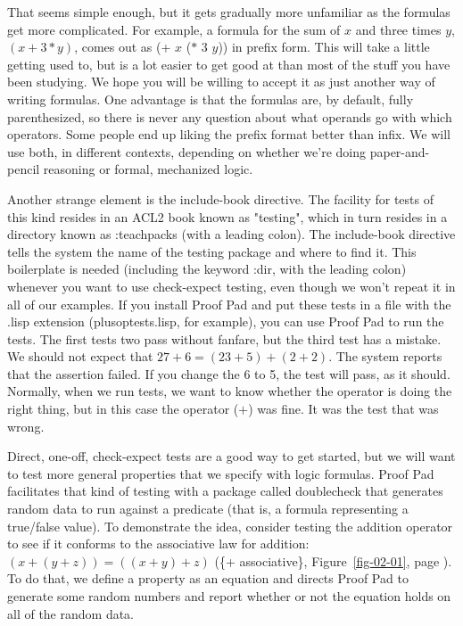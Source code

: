 That seems simple enough, but it gets gradually more unfamiliar
as the formulas get more complicated.
For example, a formula for the sum of $x$ and three times $y$, $(x + 3*y)$,
comes out as (+ $x$ ($*$ $3$ $y$)) in prefix form.
This will take a little getting used to,
but is a lot easier to get good at than
most of the stuff you have been studying.
We hope you will be willing to accept it as just another way of writing formulas.
One advantage is that the formulas are, by default, fully parenthesized,
so there is never any question about what operands go with which operators.
Some people end up liking the prefix format better than infix.
We will use both, in different contexts, depending on whether
we're doing paper-and-pencil reasoning or formal, mechanized logic.

Another strange element is the
include-book directive.
The facility for tests of this kind resides in an ACL2 book
known as "testing", which in turn resides in a directory known
as 
:teachpacks (with a leading colon).
The include-book directive tells the system
the name of the testing package and where to find it.
This boilerplate is needed (including the keyword :dir, with the leading colon)
whenever you want to use check-expect testing,
even though we won't repeat it in all of our examples.
If you install Proof Pad and put these tests in a file
with the .lisp extension (plusoptests.lisp, for example),
you can use Proof Pad to run the tests.
The first tests two pass without fanfare,
but the third test has a mistake.
We should not expect that $27 + 6 = (23 + 5) + (2 + 2)$.
The system reports that the assertion failed.
If you change the 6 to 5, the test will pass, as it should.
Normally, when we run tests, we want to know whether the
operator is doing the right thing,
but in this case the operator ($+$) was fine.
It was the test that was wrong.

Direct, one-off, check-expect tests
are a good way to get started, but
we will want to test more general properties that we specify with logic formulas.
Proof Pad facilitates that kind of testing with a package called
doublecheck
that generates random data
to run against a predicate
(that is, a formula representing a true/false value).
To demonstrate the idea, consider testing the addition operator to see if
it conforms to the associative law for addition: $(x + (y + z)) = ((x + y) + z)$
(\{+ associative\}, Figure~\ref{fig-02-01}, page \pageref{fig-02-01}).
To do that, we define a property as an equation
and directs Proof Pad to generate some random numbers and
report whether or not the equation holds on all of the random data.

